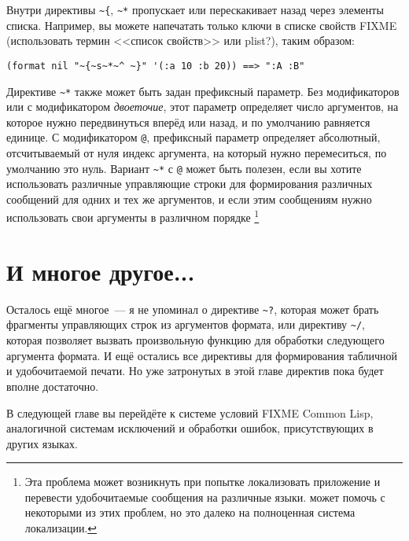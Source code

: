 Внутри директивы \lstinline!~{!, \lstinline!~*! пропускает или перескакивает назад через элементы списка. Например, вы можете
напечатать только ключи в списке свойств FIXME (использовать термин <<список свойств>> или plist?), таким образом:

\begin{lstlisting}[style=lisprepl]
  (format nil "~{~s~*~^ ~}" '(:a 10 :b 20)) ==> ":A :B"
\end{lstlisting}

Директиве \lstinline!~*! также может быть задан префиксный параметр. Без модификаторов или
с модификатором \textit{двоеточие}, этот параметр определяет число аргументов, на которое
нужно передвинуться вперёд или назад, и по умолчанию равняется единице. С модификатором
\lstinline!@!, префиксный параметр определяет абсолютный, отсчитываемый от нуля индекс
аргумента, на который нужно перемеситься, по умолчанию это нуль. Вариант \lstinline!~*! с
\lstinline!@! может быть полезен, если вы хотите использовать различные управляющие строки
для формирования различных сообщений для одних и тех же аргументов, и если этим сообщениям
нужно использовать свои аргументы в различном порядке \footnote{Эта проблема может
  возникнуть при попытке локализовать приложение и перевести удобочитаемые сообщения на
  различные языки.  может помочь с некоторыми из этих проблем, но это далеко
  на полноценная система локализации.}

\section{И многое другое...}

Осталось ещё многое~--- я не упоминал о директиве \lstinline!~?!, которая может брать
фрагменты управляющих строк из аргументов формата, или директиву \lstinline!~/!, которая
позволяет вызвать произвольную функцию для обработки следующего аргумента формата. И ещё
остались все директивы для формирования табличной и удобочитаемой печати. Но уже
затронутых в этой главе директив пока будет вполне достаточно.

В следующей главе вы перейдёте к системе условий FIXME Common Lisp, аналогичной системам
исключений и обработки ошибок, присутствующих в других языках.



